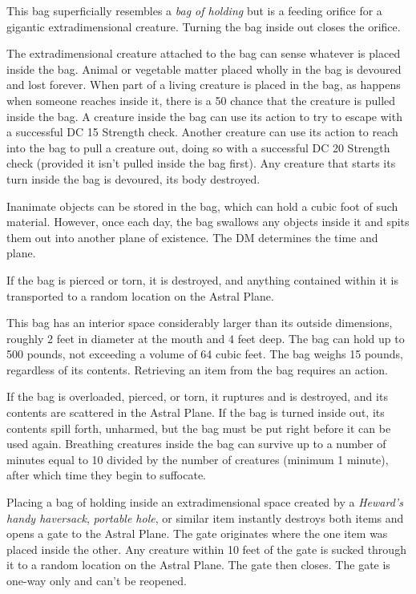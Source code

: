 \documentclass[10pt,a4paper,twoside,bg=print,twocolumn,openany,nodeprecatedcode]{dndbook}
\begin{document}
This bag superficially resembles a \textit{bag of holding} but is a feeding orifice for a gigantic extradimensional creature. Turning the bag inside out closes the orifice.

The extradimensional creature attached to the bag can sense whatever is placed inside the bag. Animal or vegetable matter placed wholly in the bag is devoured and lost forever. When part of a living creature is placed in the bag, as happens when someone reaches inside it, there is a 50 chance that the creature is pulled inside the bag. A creature inside the bag can use its action to try to escape with a successful DC 15 Strength check. Another creature can use its action to reach into the bag to pull a creature out, doing so with a successful DC 20 Strength check (provided it isn't pulled inside the bag first). Any creature that starts its turn inside the bag is devoured, its body destroyed.

Inanimate objects can be stored in the bag, which can hold a cubic foot of such material. However, once each day, the bag swallows any objects inside it and spits them out into another plane of existence. The DM determines the time and plane.

If the bag is pierced or torn, it is destroyed, and anything contained within it is transported to a random location on the Astral Plane.

This bag has an interior space considerably larger than its outside dimensions, roughly 2 feet in diameter at the mouth and 4 feet deep. The bag can hold up to 500 pounds, not exceeding a volume of 64 cubic feet. The bag weighs 15 pounds, regardless of its contents. Retrieving an item from the bag requires an action.

If the bag is overloaded, pierced, or torn, it ruptures and is destroyed, and its contents are scattered in the Astral Plane. If the bag is turned inside out, its contents spill forth, unharmed, but the bag must be put right before it can be used again. Breathing creatures inside the bag can survive up to a number of minutes equal to 10 divided by the number of creatures (minimum 1 minute), after which time they begin to suffocate.

Placing a bag of holding inside an extradimensional space created by a \textit{Heward's handy haversack}, \textit{portable hole}, or similar item instantly destroys both items and opens a gate to the Astral Plane. The gate originates where the one item was placed inside the other. Any creature within 10 feet of the gate is sucked through it to a random location on the Astral Plane. The gate then closes. The gate is one-way only and can't be reopened.
\end{document}
